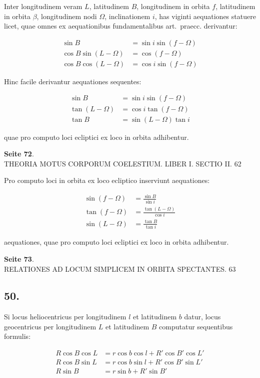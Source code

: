\documentclass[12pt,a4paper]{article}
\begin{document}
Inter longitudinem veram $L$, latitudinem $B$, longitudinem in orbita $f$, latitudinem in orbita $\beta$, longitudinem nodi $\Omega$, inclinationem $i$, has viginti aequationes statuere licet, quae omnes ex aequationibus fundamentalibus art.~praecc. derivantur:

\begin{align}
\sin B &= \sin i \sin(f - \Omega) \\
\cos B \sin(L - \Omega) &= \cos(f - \Omega) \\
\cos B \cos(L - \Omega) &= \cos i \sin(f - \Omega)
\end{align}

Hinc facile derivantur aequationes sequentes:

\begin{align}
\sin B &= \sin i \sin(f - \Omega) \\
\tan(L - \Omega) &= \cos i \tan(f - \Omega) \\
\tan B &= \sin(L - \Omega) \tan i
\end{align}

quae pro computo loci ecliptici ex loco in orbita adhibentur.

\textbf{Seite 72}.\\
THEORIA MOTUS CORPORUM COELESTIUM. LIBER I. SECTIO II. 62

Pro computo loci in orbita ex loco ecliptico inserviunt aequationes:

\begin{align}
\sin(f - \Omega) &= \frac{\sin B}{\sin i} \\
\tan(f - \Omega) &= \frac{\tan(L - \Omega)}{\cos i} \\
\sin(L - \Omega) &= \frac{\tan B}{\tan i}
\end{align}

aequationes, quae pro computo loci ecliptici ex loco in orbita adhibentur.

\textbf{Seite 73}.\\
RELATIONES AD LOCUM SIMPLICEM IN ORBITA SPECTANTES. 63

\subsection*{50.}

Si locus heliocentricus per longitudinem $l$ et latitudinem $b$ datur, locus geocentricus per longitudinem $L$ et latitudinem $B$ computatur sequentibus formulis:

\begin{align}
R \cos B \cos L &= r \cos b \cos l + R' \cos B' \cos L' \\
R \cos B \sin L &= r \cos b \sin l + R' \cos B' \sin L' \\
R \sin B &= r \sin b + R' \sin B'
\end{align}
\end{document}
